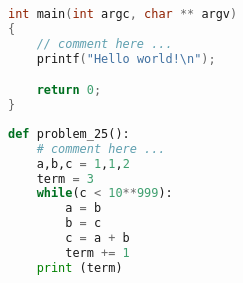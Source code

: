 \documentclass{article}
\begin{document}

\begin{lstlisting}[language=C]
int main(int argc, char ** argv)
{
    // comment here ...
    printf("Hello world!\n");

    return 0;
}
\end{lstlisting}

\begin{lstlisting}[language=python]
def problem_25():
    # comment here ...
    a,b,c = 1,1,2
    term = 3
    while(c < 10**999):
        a = b
        b = c
        c = a + b
        term += 1
    print (term)
\end{lstlisting}
\end{document}
